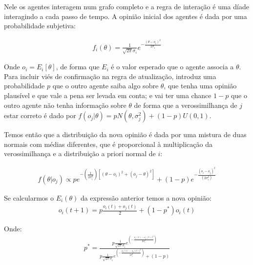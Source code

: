 Nele os agentes interagem num grafo completo e a regra de interação é uma díade
interagindo a cada passo de tempo. A opinião inicial dos agentes é dada por uma
probabilidade subjetiva:


\begin{align}
f_i(\theta) = \frac{1}{\sqrt{2 \pi} \sigma_i} e^{-
  \frac{(\theta - o_i )^2}{2 \sigma_i}}
  \end{align}

  Onde \(o_i = E_i[\theta] \), de forma que \(E_i\) é o valor esperado que o agente
  associa a \(\theta\). Para incluir viés de confirmação na regra de atualização,
   introduz uma probabilidade \(p\) que o outro
  agente saiba algo sobre $\theta$, que tenha uma opinião plausível e que vale
  a pena ser levada em conta; e vai ter uma chance \(1 - p\) que o outro agente
  não tenha informação sobre $\theta$ de forma que a verossimilhança de $j$ estar
  correto é dado por $ f(o_j|\theta) = p N(\theta,\sigma_j^2) + (1-p)U(0,1)$.

  Temos então que a distribuição da nova opinião é dada por uma mistura de duas
  normais com médias diferentes, que é proporcional à  multiplicação da
  verossimilhança e a distribuição a priori normal de $i$:
  
  \begin{align}
    f(\theta | o_j)
    \propto 
    p
    e^
    {-(\frac{1}{2\sigma_i^2})
    [(\theta - o_i)^2
    +
    (o_j - \theta )^2
    ]}
    +
    (1-p)
    e^{-\frac{(o_i - o_j)^2}{(2 \sigma_i^2)}}
  \end{align}

 Se calcularmos o $E_i(\theta)$ da expressão anterior temos a nova opinião:
  \begin{align}
    o_i(t+1)
    =
    p
    \frac{o_i(t) + o_j(t)}{2}
    +
    (1-p^*)o_i(t)
  \end{align}

  Onde:
  \begin{align}
    p^*
    =
    \frac{
      p \frac{1}{\sqrt{2 \pi} \sigma_i}
      e^{(- \frac{o_i (t) - o_j (t))^2}{2 \sigma_i^2})}
    }{
      p
      \frac{1}{\sqrt{2 \pi} \sigma_i}
    e^{(- \frac{o_i (t) - o_j (t))^2}{2 \sigma_i^2})}
    +
    (1 - p)
    }
  \end{align}

